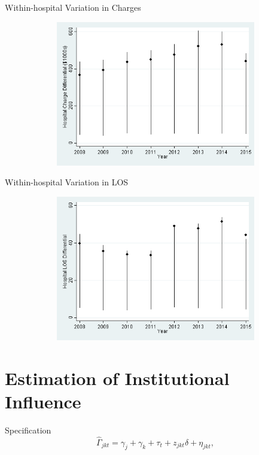 \documentclass[t]{beamer}
\begin{document}
\begin{frame}{Within-hospital Variation in Charges}
    \begin{figure}
        \centering
        \includegraphics[height=2.5in,width=5in,keepaspectratio]{HospSave_Graph_DRG}
    \end{figure}
\end{frame}

\begin{frame}{Within-hospital Variation in LOS}
    \begin{figure}
        \centering
        \includegraphics[height=2.5in,width=5in,keepaspectratio]{HospLOS_Graph_DRG}
    \end{figure}
\end{frame}


\section{Estimation of Institutional Influence}
\begin{frame}{Specification}
    \begin{equation*}
        \hat{\Gamma}_{jkt} = \gamma_{j} + \gamma_{k} + \tau_{t} + z_{jkt}\delta + \eta_{jkt},
    \end{equation*}
\end{frame}
\end{document}
